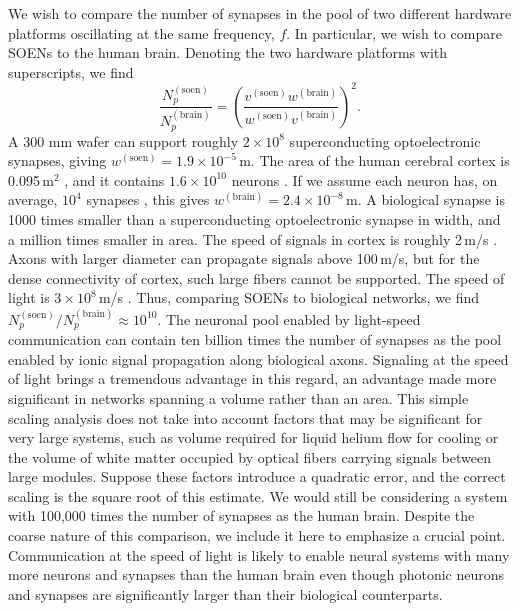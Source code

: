 \documentclass[twocolumn]{article}
\begin{document}
We wish to compare the number of synapses in the pool of two different hardware platforms oscillating at the same frequency, $f$. In particular, we wish to compare SOENs to the human brain. Denoting the two hardware platforms with superscripts, we find
\begin{equation}
\label{eq:neuronalPool_number}
\frac{N_p^{(\mathrm{soen})}}{N_p^{(\mathrm{brain})}} = \left(\frac{v^{(\mathrm{soen})}w^{(\mathrm{brain})}}{w^{(\mathrm{soen})}v^{(\mathrm{brain})}}\right)^2.
\end{equation}
A 300 mm wafer can support roughly $2\times 10^8$ superconducting optoelectronic synapses, giving $w^{(\mathrm{soen})} = 1.9\times10^{-5}$\,m. The area of the human cerebral cortex is 0.095\,m$^2$ \cite{scva2014}, and it contains $1.6\times 10^{10}$ neurons \cite{azca2009,he2009}. If we assume each neuron has, on average, $10^4$ synapses \cite{brsc1998}, this gives $w^{(\mathrm{brain})} = 2.4\times 10^{-8}$\,m. A biological synapse is 1000 times smaller than a superconducting optoelectronic synapse in width, and a million times smaller in area. The speed of signals in cortex is roughly 2\,m/s \cite{edve2004}. Axons with larger diameter can propagate signals above 100\,m/s, but for the dense connectivity of cortex, such large fibers cannot be supported. The speed of light is $3\times 10^8$\,m/s \cite{speedOfLight}. Thus, comparing SOENs to biological networks, we find $N_p^{(\mathrm{soen})}/N_p^{(\mathrm{brain})} \approx 10^{10}$. The neuronal pool enabled by light-speed communication can contain ten billion times the number of synapses as the pool enabled by ionic signal propagation along biological axons. Signaling at the speed of light brings a tremendous advantage in this regard, an advantage made more significant in networks spanning a volume rather than an area. This simple scaling analysis does not take into account factors that may be significant for very large systems, such as volume required for liquid helium flow for cooling or the volume of white matter occupied by optical fibers carrying signals between large modules. Suppose these factors introduce a quadratic error, and the correct scaling is the square root of this estimate. We would still be considering a system with 100,000 times the number of synapses as the human brain. Despite the coarse nature of this comparison, we include it here to emphasize a crucial point. Communication at the speed of light is likely to enable neural systems with many more neurons and synapses than the human brain even though photonic neurons and synapses are significantly larger than their biological counterparts.
\end{document}
